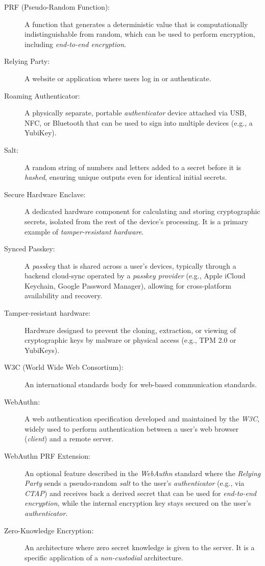 \begin{description}
\item[PRF (Pseudo-Random Function):] A function that generates a deterministic value that is computationally indistinguishable from random, which can be used to perform encryption, including \textit{end-to-end encryption}. 

\item[Relying Party:] A website or application where users log in or authenticate.

\item[Roaming Authenticator:] A physically separate, portable \textit{authenticator} device attached via USB, NFC, or Bluetooth that can be used to sign into multiple devices (e.g., a YubiKey). 

\item[Salt:] A random string of numbers and letters added to a secret before it is \textit{hashed}, ensuring unique outputs even for identical initial secrets.

\item[Secure Hardware Enclave:] A dedicated hardware component for calculating and storing cryptographic secrets, isolated from the rest of the device's processing. It is a primary example of \textit{tamper-resistant hardware}. 

\item[Synced Passkey:] A \textit{passkey} that is shared across a user's devices, typically through a backend cloud-sync operated by a \textit{passkey provider} (e.g., Apple iCloud Keychain, Google Password Manager), allowing for cross-platform availability and recovery. 

\item[Tamper-resistant hardware:] Hardware designed to prevent the cloning, extraction, or viewing of cryptographic keys by malware or physical access (e.g., TPM 2.0 or YubiKeys). 

\item[W3C (World Wide Web Consortium):] An international standards body for web-based communication standards. 

\item[WebAuthn:] A web authentication specification developed and maintained by the \textit{W3C}, widely used to perform authentication between a user’s web browser (\textit{client}) and a remote server.

\item[WebAuthn PRF Extension:] An optional feature described in the \textit{WebAuthn} standard where the \textit{Relying Party} sends a pseudo-random \textit{salt} to the user’s \textit{authenticator} (e.g., via \textit{CTAP}) and receives back a derived secret that can be used for \textit{end-to-end encryption}, while the internal encryption key stays secured on the user’s \textit{authenticator}.

\item[Zero-Knowledge Encryption:] An architecture where zero secret knowledge is given to the server. It is a specific application of a \textit{non-custodial} architecture.

\end{description}